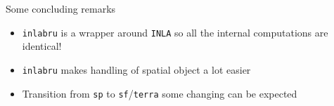 \documentclass[
  ignorenonframetext,
]{beamer}
\begin{document}
\begin{frame}[fragile]{Some concluding remarks}
\protect\hypertarget{some-concluding-remarks}{}
\begin{itemize}
\item
  \texttt{inlabru} is a wrapper around \texttt{INLA} so all the internal
  computations are identical!
\item
  \texttt{inlabru} makes handling of spatial object a lot easier
\item
  Transition from \texttt{sp} to \texttt{sf}/\texttt{terra} some
  changing can be expected
\end{itemize}
\end{frame}
\end{document}
